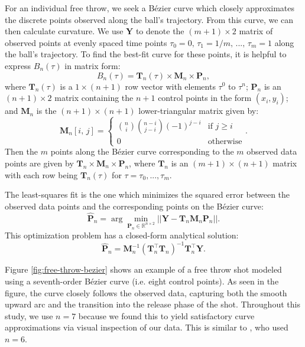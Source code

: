\documentclass{article}
\begin{document}
            For an individual free throw, we seek a Bézier curve which closely approximates the discrete points observed along the ball's trajectory. From this curve, we can then calculate curvature. We use \(\mathbf{Y}\) to denote the \( (m + 1) \times 2\) matrix of observed points at evenly spaced time points $\tau_0 = 0,\, \tau_1 = 1 / m,\, ...,\, \tau_m = 1$ along the ball's trajectory. To find the best-fit curve for these points, it is helpful to express \(B_n(\tau)\) in matrix form:
            \[
              B_n(\tau) = \mathbf{T}_n(\tau) \times \mathbf{M}_n \times \mathbf{P}_n,
            \]
            where \( \mathbf{T}_n(\tau) \) is a \( 1 \times (n+1) \) row vector with elements \( \tau^0 \) to \( \tau^n \); \( \mathbf{P}_n \) is an \( (n+1) \times 2 \) matrix containing the \( n+1 \) control points in the form \( (x_i, y_i) \); and \( \mathbf{M}_n \) is the \( (n+1) \times (n+1) \) lower-triangular matrix given by:
            \[
              \mathbf{M}_n[i,\, j] = \begin{cases}
                  \binom{n}{i} \binom{n - i} {j - i} (-1)^{j - i} & \mbox{if } j \ge i\\
                  0 & \mbox{otherwise}
              \end{cases}.
            \]
            Then the $m$ points along the Bézier curve corresponding to the $m$ observed data points are given by $\mathbf{T}_n \times \mathbf{M}_n \times \mathbf{P}_n$, where \( \mathbf{T}_n \) is an \( (m + 1) \times (n+1) \) matrix with each row being \( \mathbf{T}_n(\tau) \) for $\tau = \tau_0, ..., \tau_m$.

            The least-squares fit is the one which minimizes the squared error between the observed data points and the corresponding points on the Bézier curve:
            \[
              \hat{\mathbf{P}}_n = \arg\min_{\mathbf{P}_n \in \mathbb{R}^{n \times 2}} ||\mathbf{Y} - \mathbf{T}_n \mathbf{M}_n \mathbf{P}_n||.
            \]
            This optimization problem has a closed-form analytical solution:
            \[
              \hat{\mathbf{P}}_n = \mathbf{M}_n^{-1} (\mathbf{T}_n^\top \mathbf{T}_n)^{-1} \mathbf{T}_n^\top \mathbf{Y}.
            \]
            
            Figure \ref{fig:free-throw-bezier} shows an example of a free throw shot modeled using a seventh-order Bézier curve (i.e. eight control points). As seen in the figure, the curve closely follows the observed data, capturing both the smooth upward arc and the transition into the release phase of the shot. Throughout this study, we use $n = 7$ because we found this to yield satisfactory curve approximations via visual inspection of our data. This is similar to \citet{slegers_role_2024}, who used $n = 6$.
            
\end{document}
